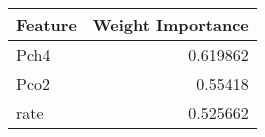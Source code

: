 \begin{longtable}{lr}
\hline
 Feature   &   Weight Importance \\
\hline
 Pch4      &            0.619862 \\
 Pco2      &            0.55418  \\
 rate      &            0.525662 \\
\hline
\end{longtable}
